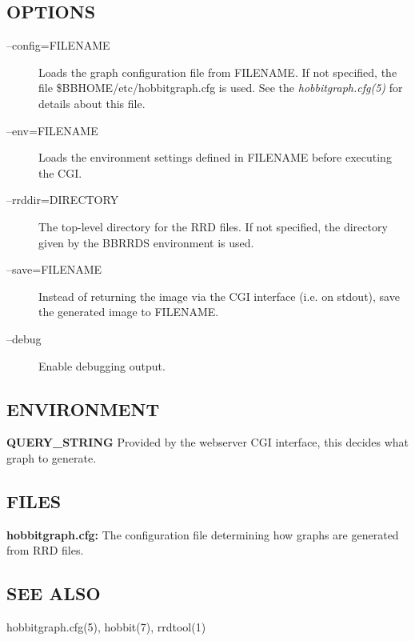 \subsection{OPTIONS}
\begin{description}
\item[--config=FILENAME] Loads the graph configuration file from FILENAME. If not specified, the file \$BBHOME/etc/hobbitgraph.cfg is used. See the \emph{hobbitgraph.cfg(5)}
 for details about this file. 

 

\item[--env=FILENAME] Loads the environment settings defined in FILENAME before executing the CGI. 

 

\item[--rrddir=DIRECTORY] The top-level directory for the RRD files. If not specified, the directory given by the BBRRDS environment is used. 

 

\item[--save=FILENAME] Instead of returning the image via the CGI interface (i.e. on stdout), save the generated image to FILENAME. 

 

\item[--debug] Enable debugging output. 

 


\end{description}
\subsection{ENVIRONMENT}


 \textbf{QUERY\_STRING}
 Provided by the webserver CGI interface, this decides what graph to generate. 


 
\subsection{FILES}


 \textbf{hobbitgraph.cfg:}
 The configuration file determining how graphs are generated from RRD files. 


 
\subsection{SEE ALSO}
hobbitgraph.cfg(5), hobbit(7), rrdtool(1) 

